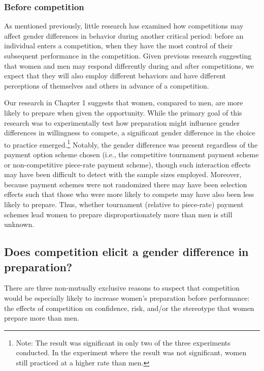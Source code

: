 \documentclass[a4paper, nobind]{templates/ociamthesis}
\begin{document}
\hypertarget{before-competition}{%
\subsubsection{Before competition}\label{before-competition}}

As mentioned previously, little research has examined how competitions may affect gender differences in behavior during another critical period: before an individual enters a competition, when they have the most control of their subsequent performance in the competition. Given previous research suggesting that women and men may respond differently during and after competitions, we expect that they will also employ different behaviors and have different perceptions of themselves and others in advance of a competition.

Our research in Chapter 1 suggests that women, compared to men, are more likely to prepare when given the opportunity. While the primary goal of this research was to experimentally test how preparation might influence gender differences in willingness to compete, a significant gender difference in the choice to practice emerged.\footnote{Note: The result was significant in only two of the three experiments conducted. In the experiment where the result was not significant, women still practiced at a higher rate than men.} Notably, the gender difference was present regardless of the payment option scheme chosen (i.e., the competitive tournament payment scheme or non-competitive piece-rate payment scheme), though such interaction effects may have been difficult to detect with the sample sizes employed. Moreover, because payment schemes were not randomized there may have been selection effects such that those who were more likely to compete may have also been less likely to prepare. Thus, whether tournament (relative to piece-rate) payment schemes lead women to prepare disproportionately more than men is still unknown.

\hypertarget{does-competition-elicit-a-gender-difference-in-preparation}{%
\subsection{Does competition elicit a gender difference in preparation?}\label{does-competition-elicit-a-gender-difference-in-preparation}}

There are three non-mutually exclusive reasons to suspect that competition would be especially likely to increase women's preparation before performance: the effects of competition on confidence, risk, and/or the stereotype that women prepare more than men.
\end{document}

